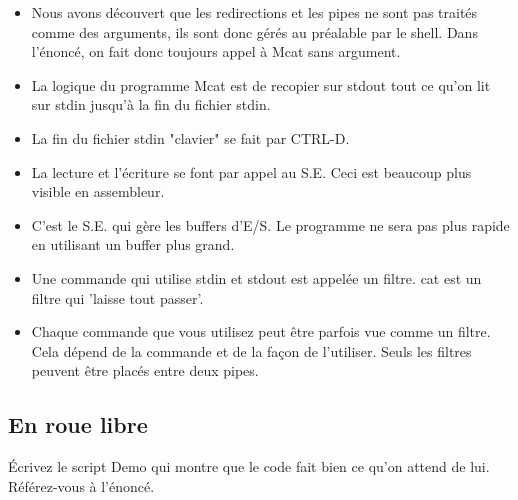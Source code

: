 \begin{itemize}
\item 
Nous avons découvert que les redirections et les pipes ne sont pas traités comme des arguments, ils sont donc gérés au préalable par le shell. Dans l'énoncé, on fait donc toujours appel à Mcat sans argument. 
\item La logique du programme Mcat est de recopier sur stdout tout ce qu'on lit sur stdin jusqu'à la fin du fichier stdin. 
\item La fin du fichier stdin "clavier" se fait par CTRL-D.
\item La lecture et l'écriture se font par appel au S.E. Ceci est beaucoup plus visible en assembleur.
\item C'est le S.E. qui gère les buffers d'E/S. Le programme ne sera pas plus rapide en utilisant un buffer plus grand.
\item Une commande qui utilise stdin et stdout est appelée un filtre. cat est un filtre qui 'laisse tout passer'.
\item Chaque commande que vous utilisez peut être parfois vue comme un filtre. Cela dépend de la commande et de la façon de l'utiliser. Seuls les filtres peuvent être placés entre deux pipes.
\end{itemize}

\subsection{En roue libre}
Écrivez le script Demo qui montre que le code fait bien ce qu'on attend de lui. Référez-vous à l'énoncé.
\newpage
